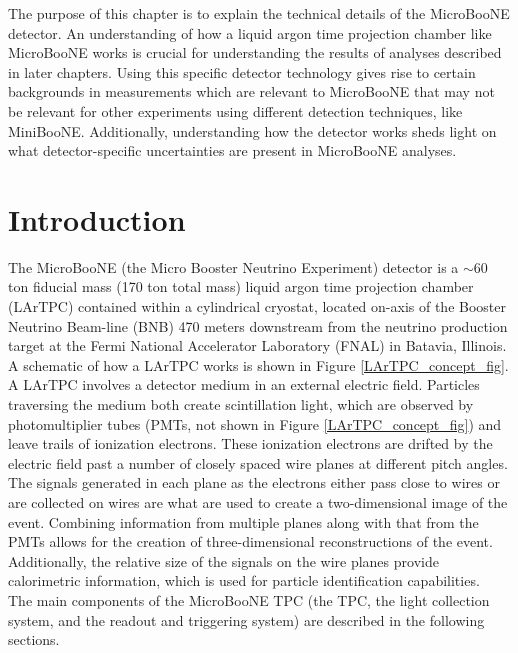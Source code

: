 The purpose of this chapter is to explain the technical details of the MicroBooNE detector. An understanding of how a liquid argon time projection chamber like MicroBooNE works is crucial for understanding the results of analyses described in later chapters. Using this specific detector technology gives rise to certain backgrounds in measurements which are relevant to MicroBooNE that may not be relevant for other experiments using different detection techniques, like MiniBooNE. Additionally, understanding how the detector works sheds light on what detector-specific uncertainties are present in MicroBooNE analyses.

\section{Introduction}
The MicroBooNE (the Micro Booster Neutrino Experiment) detector \cite{UBDetectorPaper} is a $\sim$60 ton fiducial mass (170 ton total mass) liquid argon time projection chamber (LArTPC) contained within a cylindrical cryostat, located on-axis of the Booster Neutrino Beam-line (BNB) 470 meters downstream from the neutrino production target at the Fermi National Accelerator Laboratory (FNAL) in Batavia, Illinois. A schematic of how a LArTPC works is shown in Figure \ref{LArTPC_concept_fig}. A LArTPC involves a detector medium in an external electric field. Particles traversing the medium both create scintillation light, which are observed by photomultiplier tubes (PMTs, not shown in Figure \ref{LArTPC_concept_fig}) and leave trails of ionization electrons. These ionization electrons are drifted by the electric field past a number of closely spaced wire planes at different pitch angles. The signals generated in each plane as the electrons either pass close to wires or are collected on wires are what are used to create a two-dimensional image of the event. Combining information from multiple planes along with that from the PMTs allows for the creation of three-dimensional reconstructions of the event. Additionally, the relative size of the signals on the wire planes provide calorimetric information, which is used for particle identification capabilities.\\

The main components of the MicroBooNE TPC (the TPC, the light collection system, and the readout and triggering system) are described in the following sections.

